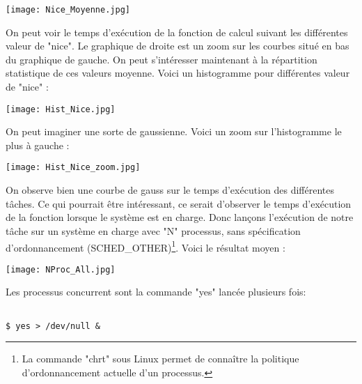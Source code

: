 \begin{center} 
\hspace{12.45cm}
\texttt{[image: Nice\_Moyenne.jpg]}
\end{center}
\vspace{1cm}

On peut voir le temps d'exécution de la fonction de calcul suivant les différentes valeur de "nice". Le graphique de droite est un zoom sur les courbes situé en bas du graphique de gauche. On peut s'intéresser maintenant à la répartition statistique de ces valeurs moyenne. Voici un histogramme pour différentes valeur de "nice" :

\begin{center} 
\hspace{12.45cm}
\texttt{[image: Hist\_Nice.jpg]}
\end{center}
\vspace{1cm}

On peut imaginer une sorte de gaussienne. Voici un zoom sur l'histogramme le plus à gauche :

\begin{center} 
\hspace{12.45cm}
\texttt{[image: Hist\_Nice\_zoom.jpg]}
\end{center}
\vspace{1cm}

On observe bien une courbe de gauss sur le temps d'exécution des différentes tâches. Ce qui pourrait être intéressant, ce serait d'observer le temps d'exécution de la fonction lorsque le système est en charge. Donc lançons l'exécution de notre tâche sur un système en charge avec "N" processus, sans spécification d'ordonnancement (SCHED\_OTHER)\footnote{La commande "chrt" sous Linux permet de connaître la politique d'ordonnancement actuelle d'un processus.}. Voici le résultat moyen :
 
\begin{center} 
\hspace{12.45cm}
\texttt{[image: NProc\_All.jpg]}
\end{center}
\vspace{0.5cm}

Les processus concurrent sont la commande "yes" lancée plusieurs fois:
\begin{lstlisting}[frame=single,style=Console]  % Start your code-block

$ yes > /dev/null &
\end{lstlisting}


